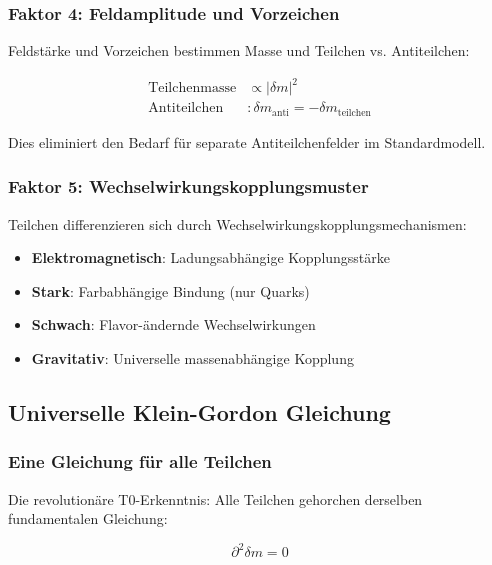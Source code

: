 \documentclass[12pt,a4paper]{article}
\newcommand{\deltafield}{\ensuremath{\delta m}}
\newcommand{\mypropto}{\ensuremath{\propto}}
\begin{document}
	\subsubsection{Faktor 4: Feldamplitude und Vorzeichen}
	\label{subsubsec:feldamplitude}
	
	Feldstärke und Vorzeichen bestimmen Masse und Teilchen vs. Antiteilchen:
	
	\begin{align}
		\text{Teilchenmasse} &\mypropto |\deltafield|^2 \\
		\text{Antiteilchen} &: \deltafield_{\text{anti}} = -\deltafield_{\text{teilchen}}
	\end{align}
	
	Dies eliminiert den Bedarf für separate Antiteilchenfelder im Standardmodell.
	
	\subsubsection{Faktor 5: Wechselwirkungskopplungsmuster}
	\label{subsubsec:kopplungsmuster}
	
	Teilchen differenzieren sich durch Wechselwirkungskopplungsmechanismen:
	\begin{itemize}
		\item \textbf{Elektromagnetisch}: Ladungsabhängige Kopplungsstärke
		\item \textbf{Stark}: Farbabhängige Bindung (nur Quarks)
		\item \textbf{Schwach}: Flavor-ändernde Wechselwirkungen
		\item \textbf{Gravitativ}: Universelle massenabhängige Kopplung
	\end{itemize}
	
	\subsection{Universelle Klein-Gordon Gleichung}
	\label{subsec:universelle_klein_gordon}
	
	\subsubsection{Eine Gleichung für alle Teilchen}
	\label{subsubsec:eine_gleichung}
	
	Die revolutionäre T0-Erkenntnis: Alle Teilchen gehorchen derselben fundamentalen Gleichung:
	
	\begin{equation}
		\boxed{\partial^2 \deltafield = 0}
		\label{eq:universelle_gleichung}
	\end{equation}
	
\end{document}
